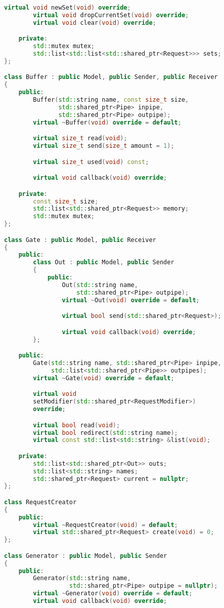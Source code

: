 \begin{lstlisting}[caption={Реализация элементов системы}, language=c++]
        virtual void newSet(void) override;
        virtual void dropCurrentSet(void) override;
        virtual void clear(void) override;

    private:
        std::mutex mutex;
        std::list<std::list<std::shared_ptr<Request>>> sets;
};

class Buffer : public Model, public Sender, public Receiver
{
    public:
        Buffer(std::string name, const size_t size,
               std::shared_ptr<Pipe> inpipe,
               std::shared_ptr<Pipe> outpipe);
        virtual ~Buffer(void) override = default;

        virtual size_t read(void);
        virtual size_t send(size_t amount = 1);

        virtual size_t used(void) const;

        virtual void callback(void) override;

    private:
        const size_t size;
        std::list<std::shared_ptr<Request>> memory;
        std::mutex mutex;
};

class Gate : public Model, public Receiver
{
    public:
        class Out : public Model, public Sender
        {
            public:
                Out(std::string name,
                    std::shared_ptr<Pipe> outpipe);
                virtual ~Out(void) override = default;

                virtual bool send(std::shared_ptr<Request>);

                virtual void callback(void) override;
        };

    public:
        Gate(std::string name, std::shared_ptr<Pipe> inpipe,
             std::list<std::shared_ptr<Pipe>> outpipes);
        virtual ~Gate(void) override = default;

        virtual void
        setModifier(std::shared_ptr<RequestModifier>)
        override;

        virtual bool read(void);
        virtual bool redirect(std::string name);
        virtual const std::list<std::string> &list(void);

    private:
        std::list<std::shared_ptr<Out>> outs;
        std::list<std::string> names;
        std::shared_ptr<Request> current = nullptr;
};

class RequestCreator
{
    public:
        virtual ~RequestCreator(void) = default;
        virtual std::shared_ptr<Request> create(void) = 0;
};

class Generator : public Model, public Sender
{
    public:
        Generator(std::string name,
                  std::shared_ptr<Pipe> outpipe = nullptr);
        virtual ~Generator(void) override = default;
        virtual void callback(void) override;


\end{lstlisting}
